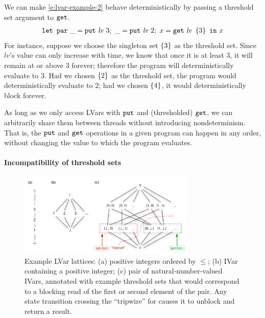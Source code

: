 We can make \ref{e:lvar-example-2} behave deterministically by passing
a threshold set argument to $\mbox{\texttt{get}}$.
\begin{equation}
\begin{split}
\mbox{\texttt{\mbox{\texttt{let}}~\mbox{\texttt{par}}}} ~\_ = \mbox{\texttt{put}}~\mathit{lv}~3;
  ~\_ = \mbox{\texttt{put}}~\mathit{lv}~2; 
  ~x = \mbox{\texttt{get}}~\mathit{lv}~\left\{3\right\} 
  ~ \mbox{\texttt{in}}~x
\end{split}
\label{e:lvar-example-3}
\end{equation}
\fi
For instance, suppose we choose the singleton set $\left\{3\right\}$ as the threshold set.  
Since $\mathit{lv}$'s value can only increase with time, we know that
once it is at least $3$, it will remain at or above $3$ forever;
therefore the program will deterministically evaluate to
$3$.  Had we chosen $\left\{2\right\}$ as the threshold set,
the program would deterministically evaluate to $2$; had we
chosen $\left\{4\right\}$, it would deterministically block forever.

As long as we only access LVars with $\mbox{\texttt{put}}$ and (thresholded) $\mbox{\texttt{get}}$, we can
arbitrarily share them between threads without introducing nondeterminism. That
is, the $\mbox{\texttt{put}}$ and $\mbox{\texttt{get}}$ operations in a given program can happen in any order,
without changing the value to which the program evaluates.

\paragraph{Incompatibility of threshold sets}

\begin{figure}
\centering
\includegraphics[width=3.3in]{chapter3/figures/ExampleLattices3.pdf} 
  \caption{Example LVar lattices: (a)
    positive integers ordered by $\leq$; (b) IVar
    containing a positive integer; (c) pair of natural-number-valued IVars, 
    annotated with example threshold
    sets that would correspond to a blocking read of the first or
    second element of the pair.
    Any state transition crossing the
    ``tripwire'' for  causes it to unblock
    and return a result.}

  \label{f:lattice-examples}
\end{figure}

